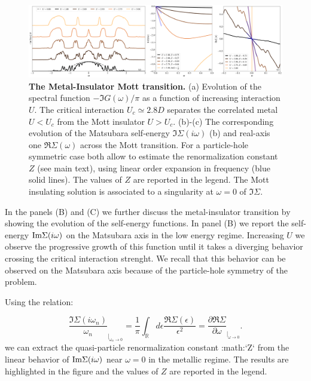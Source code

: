 \documentclass[edipack2.tex]{subfiles}
\begin{document}
\begin{figure}[t!]
  \includegraphics[width=\linewidth]{figures/figBethe.pdf}
    \caption{\label{figEx1}%
      \textbf{The Metal-Insulator Mott transition.}
      (a) Evolution of the spectral function $-\Im{G}(\omega)/\pi$ as
      a function of increasing interaction $U$. The critical
      interaction $U_c\simeq 2.8D$ separates the correlated metal $U<U_c$ from
      the Mott insulator $U>U_c$.
      (b)-(c) The corresponding evolution of the Matsubara self-energy
      $\Im\Sigma(i\omega)$ (b) and
      real-axis one $\Re\Sigma(\omega)$ across the Mott
      transition. For a particle-hole symmetric case both allow to
      estimate the renormalization constant $Z$ (see main text), using
      linear order expansion in frequency (blue solid lines). The
      values of $Z$ are reported in the legend.
      The Mott insulating solution is associated to a singularity at
      $\omega=0$ of $\Im\Sigma$. 
        }
\end{figure}



In the panels (B) and (C) we further discuss the metal-insulator
transition by showing the evolution of the self-energy functions.
In panel (B) we report the self-energy ${\rm Im}\Sigma(i\omega)$
on the Matsubara axis in the low energy regime. Increasing $U$
we observe the progressive growth of this function until it takes a
diverging behavior crossing the critical interaction strenght. We
recall that this behavior can be observed on the Matsubara axis
because of the particle-hole symmetry of the problem.

Using the relation:

$$
   \frac{\Im\Sigma(i\omega_n)}{\omega_n}_{|_{\omega_n\rightarrow 0}}=
   \frac{1}{\pi}\int_{\mathbb R}d\epsilon \frac{\Re\Sigma(\epsilon)}{\epsilon^2}=
   \frac{\partial\Re\Sigma}{\partial\omega}_{|_{\omega\rightarrow 0}}.
$$
we can extract the quasi-particle renormalization constant :math:`Z`
from the linear behavior of ${\rm Im}\Sigma(i\omega)$ near
$\omega=0$ in the metallic regime. The results are highlighted
in the figure and the values of $Z$ are reported in the legend.
\end{document}
